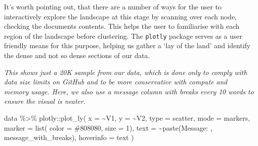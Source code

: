 \documentclass[
  letterpaper,
  DIV=11,
  numbers=noendperiod]{scrreprt}
\newenvironment{Shaded}{\begin{snugshade}}{\end{snugshade}}
\newcommand{\AttributeTok}[1]{\textcolor[rgb]{0.40,0.45,0.13}{#1}}
\newcommand{\DecValTok}[1]{\textcolor[rgb]{0.68,0.00,0.00}{#1}}
\newcommand{\FunctionTok}[1]{\textcolor[rgb]{0.28,0.35,0.67}{#1}}
\newcommand{\NormalTok}[1]{\textcolor[rgb]{0.00,0.23,0.31}{#1}}
\newcommand{\SpecialCharTok}[1]{\textcolor[rgb]{0.37,0.37,0.37}{#1}}
\newcommand{\StringTok}[1]{\textcolor[rgb]{0.13,0.47,0.30}{#1}}
\begin{document}
It's worth pointing out, that there are a number of ways for the user to
interactively explore the landscape at this stage by scanning over each
node, checking the documents contents. This helps the user to
familiarise with each region of the landscape before clustering. The
\texttt{plotly} package serves as a user friendly means for this
purpose, helping us gather a `lay of the land' and identify the dense
and not so dense sections of our data.

\begin{tcolorbox}[enhanced jigsaw, opacitybacktitle=0.6, breakable, title=\textcolor{quarto-callout-note-color}{\faInfo}\hspace{0.5em}{Note}, arc=.35mm, colframe=quarto-callout-note-color-frame, colbacktitle=quarto-callout-note-color!10!white, left=2mm, bottomrule=.15mm, opacityback=0, toprule=.15mm, bottomtitle=1mm, toptitle=1mm, titlerule=0mm, leftrule=.75mm, colback=white, rightrule=.15mm, coltitle=black]

\emph{This shows just a 20K sample from our data, which is done only to
comply with data size limits on GitHub and to be more conservative with
compute and memory usage. Here, we also use a message column with breaks
every 10 words to ensure the visual is neater.}

\end{tcolorbox}

\begin{Shaded}
\begin{Highlighting}[]
\NormalTok{data }\SpecialCharTok{\%\textgreater{}\%}\NormalTok{ plotly}\SpecialCharTok{::}\FunctionTok{plot\_ly}\NormalTok{(}
  \AttributeTok{x =} \SpecialCharTok{\textasciitilde{}}\NormalTok{V1,}
  \AttributeTok{y =} \SpecialCharTok{\textasciitilde{}}\NormalTok{V2,}
  \AttributeTok{type =} \StringTok{\textquotesingle{}scatter\textquotesingle{}}\NormalTok{,}
  \AttributeTok{mode =} \StringTok{\textquotesingle{}markers\textquotesingle{}}\NormalTok{,}
  \AttributeTok{marker =} \FunctionTok{list}\NormalTok{( }\AttributeTok{color =} \StringTok{\textquotesingle{}\#808080\textquotesingle{}}\NormalTok{, }\AttributeTok{size =} \DecValTok{1}\NormalTok{),}
  \AttributeTok{text =} \SpecialCharTok{\textasciitilde{}}\FunctionTok{paste}\NormalTok{(}\StringTok{\textquotesingle{}Message: \textquotesingle{}}\NormalTok{, message\_with\_breaks),}
  \AttributeTok{hoverinfo =} \StringTok{\textquotesingle{}text\textquotesingle{}}
\NormalTok{)}
\end{Highlighting}
\end{Shaded}
\end{document}
